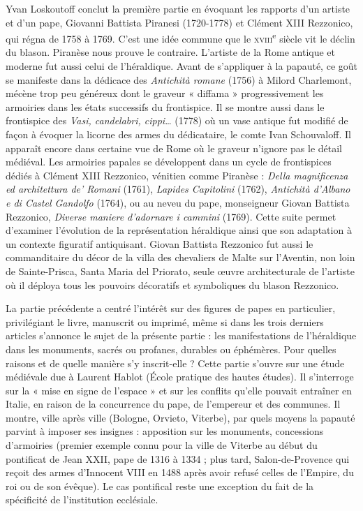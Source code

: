 \documentclass[12pt,twoside,openany]{book}
\begin{document}
Yvan Loskoutoff conclut la première partie en évoquant les rapports d’un artiste et d’un pape, Giovanni Battista Piranesi (1720-1778) et Clément XIII Rezzonico, qui régna de 1758 à 1769. C’est une idée commune que le \textsc{xviii}\textsuperscript{e} siècle vit le déclin du blason. Piranèse nous prouve le contraire. L’artiste de la Rome antique et moderne fut aussi celui de l’héraldique. Avant de s’appliquer à la papauté, ce goût se manifeste dans la dédicace des \textit{Antichità romane} (1756) à Milord Charlemont, mécène trop peu généreux dont le graveur « diffama » progressivement les armoiries dans les états successifs du frontispice. Il se montre aussi dans le frontispice des \textit{Vasi, candelabri, cippi}… (1778) où un vase antique fut modifié de façon à évoquer la licorne des armes du dédicataire, le comte Ivan Schouvaloff. Il apparaît encore dans certaine vue de Rome où le graveur n’ignore pas le détail médiéval. Les armoiries papales se développent dans un cycle de frontispices dédiés à Clément XIII Rezzonico, vénitien comme Piranèse : \textit{Della magnificenza ed architettura de’ Romani} (1761), \textit{Lapides Capitolini }(1762), \textit{Antichità d’Albano e di Castel Gandolfo} (1764), ou au neveu du pape, monseigneur Giovan Battista Rezzonico, \textit{Diverse maniere d’adornare i cammini} (1769). Cette suite permet d’examiner l’évolution de la représentation héraldique ainsi que son adaptation à un contexte figuratif antiquisant. Giovan Battista Rezzonico fut aussi le commanditaire du décor de la villa des chevaliers de Malte sur l’Aventin, non loin de Sainte-Prisca, Santa Maria del Priorato, seule œuvre architecturale de l’artiste où il déploya tous les pouvoirs décoratifs et symboliques du blason Rezzonico.

La partie précédente a centré l’intérêt sur des figures de papes en particulier, privilégiant le livre, manuscrit ou imprimé, même si dans les trois derniers articles s’annonce le sujet de la présente partie : les manifestations de l’héraldique dans les monuments, sacrés ou profanes, durables ou éphémères. Pour quelles raisons et de quelle manière s’y inscrit-elle ? Cette partie s’ouvre sur une étude médiévale due à Laurent Hablot (École pratique des hautes études). Il s’interroge sur la « mise en signe de l’espace » et sur les conflits qu’elle pouvait entraîner en Italie, en raison de la concurrence du pape, de l’empereur et des communes. Il montre, ville après ville (Bologne, Orvieto, Viterbe), par quels moyens la papauté parvint à imposer ses insignes : apposition sur les monuments, concessions d’armoiries (premier exemple connu pour la ville de Viterbe au début du pontificat de Jean XXII, pape de 1316 à 1334 ; plus tard, Salon-de-Provence qui reçoit des armes d’Innocent VIII en 1488 après avoir refusé celles de l’Empire, du roi ou de son évêque). Le cas pontifical reste une exception du fait de la spécificité de l’institution ecclésiale.
\end{document}
